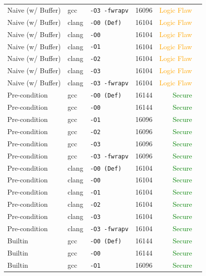 \begin{table}[htbp]
\begin{tabular}{@{}lllcrl@{}}
Naive (w/ Buffer) & gcc & \texttt{-O3 -fwrapv} & 16096 & \textcolor{orange}{Logic Flaw} \\
Naive (w/ Buffer) & clang & \texttt{-O0 (Def)} & 16104 & \textcolor{orange}{Logic Flaw} \\
Naive (w/ Buffer) & clang & \texttt{-O0} & 16104 & \textcolor{orange}{Logic Flaw} \\
Naive (w/ Buffer) & clang & \texttt{-O1} & 16104 & \textcolor{orange}{Logic Flaw} \\
Naive (w/ Buffer) & clang & \texttt{-O2} & 16104 & \textcolor{orange}{Logic Flaw} \\
Naive (w/ Buffer) & clang & \texttt{-O3} & 16104 & \textcolor{orange}{Logic Flaw} \\
Naive (w/ Buffer) & clang & \texttt{-O3 -fwrapv} & 16104 & \textcolor{orange}{Logic Flaw} \\
\midrule
Pre-condition & gcc & \texttt{-O0 (Def)} & 16144 & \textcolor{green}{Secure}} \\
Pre-condition & gcc & \texttt{-O0} & 16144 & \textcolor{green}{Secure}} \\
Pre-condition & gcc & \texttt{-O1} & 16096 & \textcolor{green}{Secure}} \\
Pre-condition & gcc & \texttt{-O2} & 16096 & \textcolor{green}{Secure}} \\
Pre-condition & gcc & \texttt{-O3} & 16096 & \textcolor{green}{Secure}} \\
Pre-condition & gcc & \texttt{-O3 -fwrapv} & 16096 & \textcolor{green}{Secure}} \\
Pre-condition & clang & \texttt{-O0 (Def)} & 16104 & \textcolor{green}{Secure}} \\
Pre-condition & clang & \texttt{-O0} & 16104 & \textcolor{green}{Secure}} \\
Pre-condition & clang & \texttt{-O1} & 16104 & \textcolor{green}{Secure}} \\
Pre-condition & clang & \texttt{-O2} & 16104 & \textcolor{green}{Secure}} \\
Pre-condition & clang & \texttt{-O3} & 16104 & \textcolor{green}{Secure}} \\
Pre-condition & clang & \texttt{-O3 -fwrapv} & 16104 & \textcolor{green}{Secure}} \\
\midrule
Builtin & gcc & \texttt{-O0 (Def)} & 16144 & \textcolor{green}{Secure}} \\
Builtin & gcc & \texttt{-O0} & 16144 & \textcolor{green}{Secure}} \\
Builtin & gcc & \texttt{-O1} & 16096 & \textcolor{green}{Secure}} \\

\end{tabular}
\end{table}
